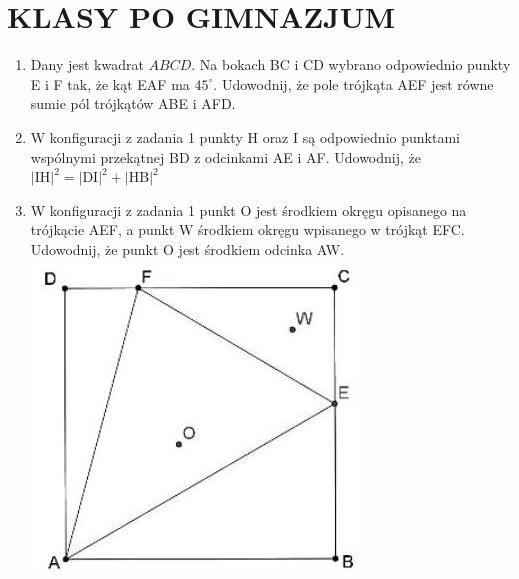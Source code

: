 \documentclass[10pt]{article}
\begin{document}
\section*{KLASY PO GIMNAZJUM}
\begin{enumerate}
  \item Dany jest kwadrat \(A B C D\). Na bokach BC i CD wybrano odpowiednio punkty E i F tak, że kąt EAF ma \(45^{\circ}\). Udowodnij, że pole trójkąta AEF jest równe sumie pól trójkątów ABE i AFD.
  \item W konfiguracji z zadania 1 punkty H oraz I są odpowiednio punktami wspólnymi przekątnej BD z odcinkami AE i AF. Udowodnij, że \(|\mathrm{IH}|^{2}=|\mathrm{DI}|^{2}+|\mathrm{HB}|^{2}\)
  \item W konfiguracji z zadania 1 punkt O jest środkiem okręgu opisanego na trójkącie AEF, a punkt W środkiem okręgu wpisanego w trójkąt EFC. Udowodnij, że punkt O jest środkiem odcinka AW.\\
\includegraphics[max width=\textwidth, center]{2024_11_21_7df58923022be014b7d0g-1}
\end{enumerate}
\end{document}
